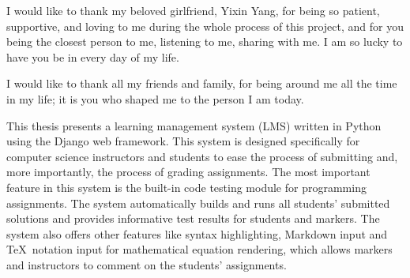 \medskip

I would like to thank my beloved girlfriend, Yixin Yang,
for being so patient, supportive, and loving to me during the whole process
of this project, 
and for you being the closest person to me, listening to me, sharing with me.
I am so lucky to have you be in every day of my life.

\medskip

I would like to thank all my friends and family, for being around me all
the time in my life; it is you who shaped me to the person
I am today.



\tocAndSuch



This thesis presents a learning management system (LMS) written in Python using
the Django web framework. This system is designed specifically for computer
science instructors and students to ease the process of submitting and,
more importantly, the process of grading assignments. 
The most important feature in this system is the built-in code
testing module for programming assignments. The system
automatically builds and runs all students'
submitted solutions and provides informative test results for students and
markers.
The system also offers other features like syntax highlighting, Markdown input
and \TeX\ notation input for mathematical equation rendering, which allows
markers and instructors to comment on the students' assignments.



\afterpreface
